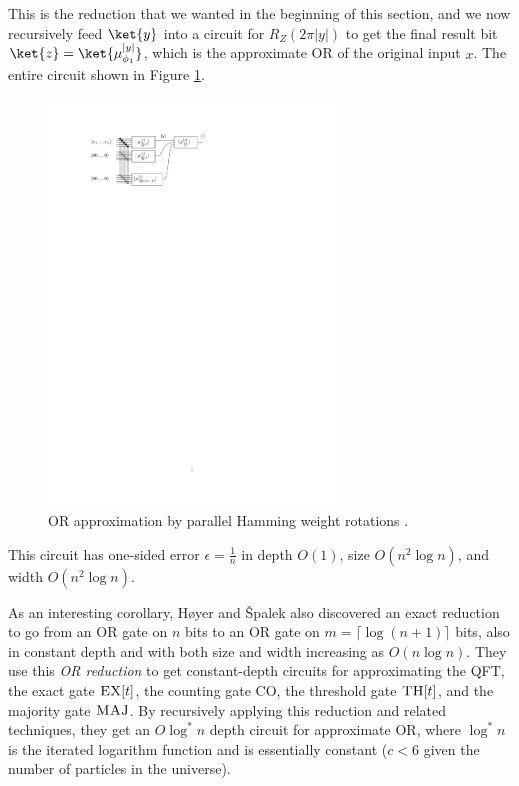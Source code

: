This is the reduction that we wanted in the beginning of this section, and
we now recursively feed $\ket{y}$ into a circuit for $R_Z(2\pi|y|)$ to get
the final result bit $\ket{z} = \ket{\mu_{\phi_1}^{|y|}}$, which is
the approximate \textsc{OR} of the original input $x$.
The entire circuit shown in Figure \ref{fig:or-approx}.

\begin{center}
\begin{figure}
\includegraphics[width=3in]{figures/or-approx.pdf}
\caption{\textsc{OR} approximation by parallel Hamming weight rotations \cite{Hoyer2002}.}
\label{fig:or-approx}
\end{figure}
\end{center}

This circuit has one-sided error $\epsilon = \frac{1}{n}$ in depth $O(1)$,
size $O(n^2 \log n)$, and width $O(n^2 \log n)$.

As an interesting corollary,
H{\o}yer and {\v S}palek also discovered an exact reduction to go from an \textsc{OR} gate
on $n$ bits to an \textsc{OR} gate on $m=\lceil \log(n+1) \rceil$ bits, also in
constant depth and with both size and width increasing as $O(n \log n)$.
They use this \emph{\textsc{OR} reduction} to get constant-depth
circuits for approximating the QFT, the exact gate $\textsc{EX}[t]$, the counting gate CO,
the threshold gate $\textsc{TH}[t]$, and the majority gate $\textsc{MAJ}$.
By recursively applying this reduction and related techniques, they
get an $O\log^*{n}$ depth circuit for approximate \textsc{OR},
where $\log^*n$ is the iterated logarithm function and is essentially constant
($c < 6$ given the number of particles in the universe).


